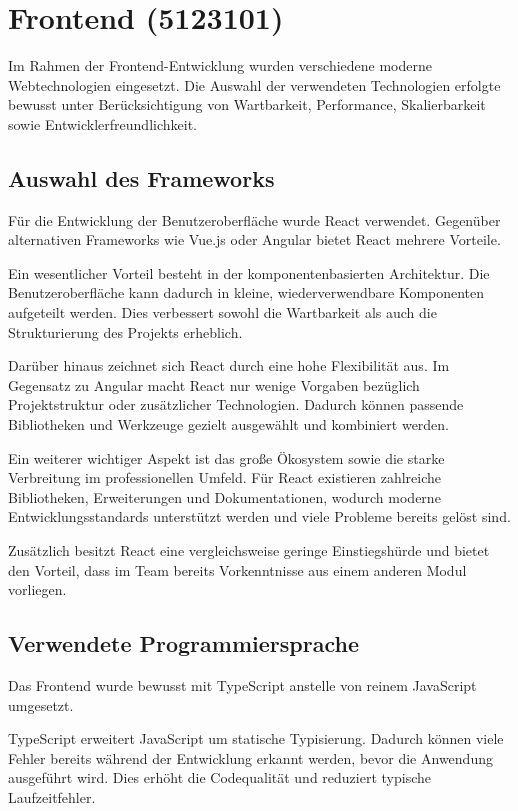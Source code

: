 \section{Frontend (5123101)}
Im Rahmen der Frontend-Entwicklung wurden verschiedene moderne Webtechnologien eingesetzt. Die Auswahl der verwendeten Technologien erfolgte bewusst unter Berücksichtigung von Wartbarkeit, Performance, Skalierbarkeit sowie Entwicklerfreundlichkeit.

\subsection{Auswahl des Frameworks}
Für die Entwicklung der Benutzeroberfläche wurde React verwendet. Gegenüber alternativen Frameworks wie Vue.js oder Angular bietet React mehrere Vorteile.

Ein wesentlicher Vorteil besteht in der komponentenbasierten Architektur. Die Benutzeroberfläche kann dadurch in kleine, wiederverwendbare Komponenten aufgeteilt werden. Dies verbessert sowohl die Wartbarkeit als auch die Strukturierung des Projekts erheblich.

Darüber hinaus zeichnet sich React durch eine hohe Flexibilität aus. Im Gegensatz zu Angular macht React nur wenige Vorgaben bezüglich Projektstruktur oder zusätzlicher Technologien. Dadurch können passende Bibliotheken und Werkzeuge gezielt ausgewählt und kombiniert werden.

Ein weiterer wichtiger Aspekt ist das große Ökosystem sowie die starke Verbreitung im professionellen Umfeld. Für React existieren zahlreiche Bibliotheken, Erweiterungen und Dokumentationen, wodurch moderne Entwicklungsstandards unterstützt werden und viele Probleme bereits gelöst sind.

Zusätzlich besitzt React eine vergleichsweise geringe Einstiegshürde und bietet den Vorteil, dass im Team bereits Vorkenntnisse aus einem anderen Modul vorliegen.

\subsection{Verwendete Programmiersprache}
Das Frontend wurde bewusst mit TypeScript anstelle von reinem JavaScript umgesetzt.

TypeScript erweitert JavaScript um statische Typisierung. Dadurch können viele Fehler bereits während der Entwicklung erkannt werden, bevor die Anwendung ausgeführt wird. Dies erhöht die Codequalität und reduziert typische Laufzeitfehler.

